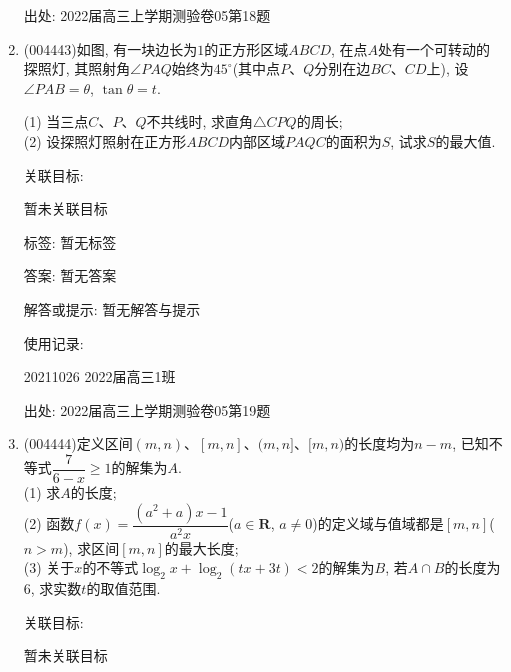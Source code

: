 \documentclass[10pt,a4paper]{article}
\begin{document}
\begin{enumerate}[1.]
出处: 2022届高三上学期测验卷05第18题
\item { (004443)}如图, 有一块边长为$1$的正方形区域$ABCD$, 在点$A$处有一个可转动的探照灯, 其照射角$\angle PAQ$始终为$45^\circ$(其中点$P$、$Q$分别在边$BC$、$CD$上), 设$\angle PAB=\theta$, $\tan \theta =t$.
\begin{center}
\end{center}
(1) 当三点$C$、$P$、$Q$不共线时, 求直角$\triangle CPQ$的周长;\\
(2) 设探照灯照射在正方形$ABCD$内部区域$PAQC$的面积为$S$, 试求$S$的最大值.


关联目标:

暂未关联目标



标签: 暂无标签

答案: 暂无答案

解答或提示: 暂无解答与提示

使用记录:

20211026	2022届高三1班		


出处: 2022届高三上学期测验卷05第19题
\item { (004444)}定义区间$(m,n)$、$[m,n]$、$(m,n]$、$[m,n)$的长度均为$n-m$, 已知不等式$\dfrac 7{6-x}\ge 1$的解集为$A$.\\
(1) 求$A$的长度;\\
(2) 函数$f(x)=\dfrac{(a^2+a)x-1}{a^2x}$($a\in \mathbf{R}$, $a\ne 0$)的定义域与值域都是$[m,n]$($n>m$), 求区间$[m,n]$的最大长度;\\
(3) 关于$x$的不等式$\log_2x+\log_2(tx+3t)<2$的解集为$B$, 若$A\cap B$的长度为$6$, 求实数$t$的取值范围.


关联目标:

暂未关联目标




\end{enumerate}
\end{document}
